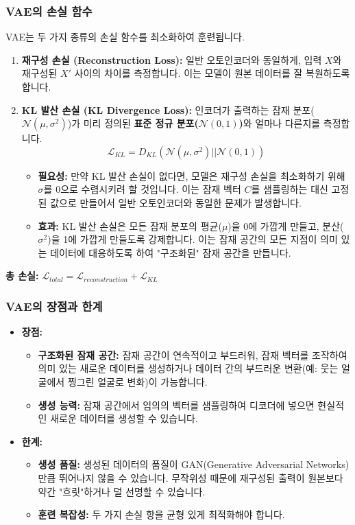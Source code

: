 \documentclass[11pt,a4paper]{article}
\begin{document}
\subsubsection{VAE의 손실 함수}
VAE는 두 가지 종류의 손실 함수를 최소화하여 훈련됩니다.
\begin{enumerate}
    \item \textbf{재구성 손실 (Reconstruction Loss):} 일반 오토인코더와 동일하게, 입력 $X$와 재구성된 $X'$ 사이의 차이를 측정합니다. 이는 모델이 원본 데이터를 잘 복원하도록 합니다.
    \item \textbf{KL 발산 손실 (KL Divergence Loss):} 인코더가 출력하는 잠재 분포($\mathcal{N}(\mu, \sigma^2)$)가 미리 정의된 \textbf{표준 정규 분포($\mathcal{N}(0, 1)$)}와 얼마나 다른지를 측정합니다.
    \[ \mathcal{L}_{KL} = D_{KL}(\mathcal{N}(\mu, \sigma^2) || \mathcal{N}(0, 1)) \]
    \begin{itemize}
        \item \textbf{필요성:} 만약 KL 발산 손실이 없다면, 모델은 재구성 손실을 최소화하기 위해 $\sigma$를 0으로 수렴시키려 할 것입니다. 이는 잠재 벡터 $C$를 샘플링하는 대신 고정된 값으로 만들어서 일반 오토인코더와 동일한 문제가 발생합니다.
        \item \textbf{효과:} KL 발산 손실은 모든 잠재 분포의 평균($\mu$)을 0에 가깝게 만들고, 분산($\sigma^2$)을 1에 가깝게 만들도록 강제합니다. 이는 잠재 공간의 모든 지점이 의미 있는 데이터에 대응하도록 하여 "구조화된" 잠재 공간을 만듭니다.
    \end{itemize}
\end{enumerate}
\textbf{총 손실:} $\mathcal{L}_{total} = \mathcal{L}_{reconstruction} + \mathcal{L}_{KL}$

\subsubsection{VAE의 장점과 한계}
\begin{itemize}
    \item \textbf{장점:}
    \begin{itemize}
        \item \textbf{구조화된 잠재 공간:} 잠재 공간이 연속적이고 부드러워, 잠재 벡터를 조작하여 의미 있는 새로운 데이터를 생성하거나 데이터 간의 부드러운 변환(예: 웃는 얼굴에서 찡그린 얼굴로 변화)이 가능합니다.
        \item \textbf{생성 능력:} 잠재 공간에서 임의의 벡터를 샘플링하여 디코더에 넣으면 현실적인 새로운 데이터를 생성할 수 있습니다.
    \end{itemize}
    \item \textbf{한계:}
    \begin{itemize}
        \item \textbf{생성 품질:} 생성된 데이터의 품질이 GAN(Generative Adversarial Networks)만큼 뛰어나지 않을 수 있습니다. 무작위성 때문에 재구성된 출력이 원본보다 약간 "흐릿"하거나 덜 선명할 수 있습니다.
        \item \textbf{훈련 복잡성:} 두 가지 손실 항을 균형 있게 최적화해야 합니다.
    \end{itemize}
\end{itemize}
\end{document}
